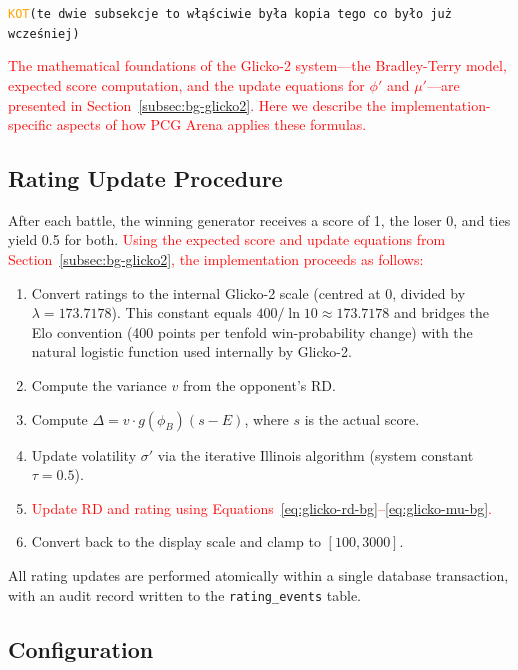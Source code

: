 \documentclass[shortabstract, mgr, english]{iithesis}
\newcommand{\DEBUG}[1]{{#1}} %
\newcommand{\KOT}[1]{\DEBUG{\tt{\textcolor{orange}{KOT}(}{#1}{)}}}
\newcommand{\changed}[1]{\textcolor{red}{#1}}
\begin{document}
\KOT{te dwie subsekcje to włąściwie była kopia tego co było już wcześniej}

\changed{The mathematical foundations of the Glicko-2 system---the Bradley-Terry
model, expected score computation, and the update equations for $\phi'$ and
$\mu'$---are presented in Section~\ref{subsec:bg-glicko2}. Here we describe the
implementation-specific aspects of how PCG Arena applies these formulas.}

\subsection{Rating Update Procedure}
\label{subsec:sd-glicko-update}

After each battle, the winning generator receives a score of 1, the loser 0, and ties
yield 0.5 for both. \changed{Using the expected score and update equations from
Section~\ref{subsec:bg-glicko2}, the implementation proceeds as follows:}

\begin{enumerate}
    \item Convert ratings to the internal Glicko-2 scale (centred at 0, divided by
          $\lambda = 173.7178$).  This constant equals $400 / \ln 10 \approx 173.7178$
          and bridges the Elo convention (400 points per tenfold win-probability change)
          with the natural logistic function used internally by Glicko-2.
    \item Compute the variance $v$ from the opponent's RD.
    \item Compute $\Delta = v \cdot g(\phi_B)(s - E)$, where $s$ is the actual score.
    \item Update volatility $\sigma'$ via the iterative Illinois algorithm
          (system constant $\tau = 0.5$).
    \item \changed{Update RD and rating using Equations~\ref{eq:glicko-rd-bg}--\ref{eq:glicko-mu-bg}.}
    \item Convert back to the display scale and clamp to $[100, 3000]$.
\end{enumerate}

All rating updates are performed atomically within a single database transaction, with
an audit record written to the \texttt{rating\_events} table.

\subsection{Configuration}
\label{subsec:sd-glicko-config}
\end{document}
